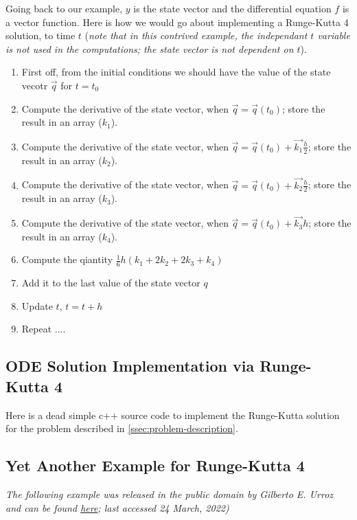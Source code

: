 \documentclass[12pt,a4paper,twoside]{report}
\begin{document}
Going back to our example, \( y \) is the state vector and the differential equation 
\( f \) is a vector function. Here is how we would go about implementing a 
Runge-Kutta 4 solution, to time \( t \) (\textit{note that in this contrived example, 
the independant \( t \) variable is not used in the computations; the state vector 
is not dependent on \(t\)}).
\begin{enumerate}
  \item First off, from the initial conditions we should have the value of the state vecotr \( \vec{q} \) for \( t = t_0 \)
  \item Compute the derivative of the state vector, when \( \vec{q} = \vec{q}(t_0) \); 
  store the result in an array (\( k_1 \)).
  \item Compute the derivative of the state vector, when \( \vec{q} = \vec{q}(t_0)+\vec{k_1} \frac{h}{2} \); store the result in an array (\( k_2 \)).
  \item Compute the derivative of the state vector, when \( \vec{q} = \vec{q}(t_0)+\vec{k_2} \frac{h}{2} \); store the result in an array (\( k_3 \)).
  \item Compute the derivative of the state vector, when \( \vec{q} = \vec{q}(t_0)+\vec{k_3} h \); store the result in an array (\( k_4 \)).
  \item Compute the qiantity \( \frac{1}{6} h (k_1 + 2 k_2 + 2 k_3 + k_4) \)
  \item Add it to the last value of the state vector \( q \)
  \item Update \( t \), \( t = t + h \)
  \item Repeat  ....
\end{enumerate}

\subsection{ODE Solution Implementation via Runge-Kutta 4}
Here is a dead simple c++ source code to implement the Runge-Kutta solution for the 
problem described in \ref{ssec:problem-description}.


\subsection{Yet Another Example for Runge-Kutta 4}
\emph{The following example was released in the public domain by Gilberto E. Urroz 
and can be found \href{https://smath.com/wiki/GetFile.aspx?File=Examples/RK4-2ndOrderODE.pdf}{here}; 
last accessed 24 March, 2022)}
\end{document}
